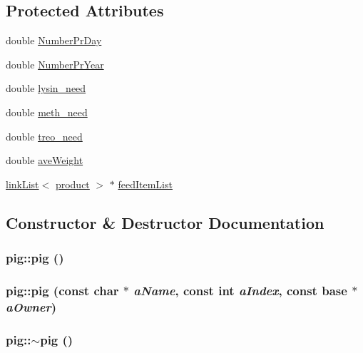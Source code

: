 \subsection*{Protected Attributes}
\begin{DoxyCompactItemize}
\item 
double \hyperlink{classpig_abcbba53abf12eb308dc0222c6d4ce98a}{NumberPrDay}
\item 
double \hyperlink{classpig_afb0194a6ded917d3d286165e25cec0cd}{NumberPrYear}
\item 
double \hyperlink{classpig_a63e7cb037c0c044934a7fbd10506fb4f}{lysin\_\-need}
\item 
double \hyperlink{classpig_aaf0ac7abae7bd899541a8d2bc678f663}{meth\_\-need}
\item 
double \hyperlink{classpig_a075e78b1499a2a990cfc8ca062e8654b}{treo\_\-need}
\item 
double \hyperlink{classpig_ad0d49e469ffa3c79f23862863ec04735}{aveWeight}
\item 
\hyperlink{classlink_list}{linkList}$<$ \hyperlink{classproduct}{product} $>$ $\ast$ \hyperlink{classpig_aed511510eabc8fc25f1048f0528b86cf}{feedItemList}
\end{DoxyCompactItemize}


\subsection{Constructor \& Destructor Documentation}
\hypertarget{classpig_af941f59904d0c80142ef3dd970c00e17}{
\subsubsection[{pig}]{\setlength{\rightskip}{0pt plus 5cm}pig::pig ()}}
\label{classpig_af941f59904d0c80142ef3dd970c00e17}
\hypertarget{classpig_a6da82d7be7f29bba53eb9cb1081091ca}{
\subsubsection[{pig}]{\setlength{\rightskip}{0pt plus 5cm}pig::pig (const char $\ast$ {\em aName}, \/  const int {\em aIndex}, \/  const {\bf base} $\ast$ {\em aOwner})}}
\label{classpig_a6da82d7be7f29bba53eb9cb1081091ca}
\hypertarget{classpig_a12bb73819ea97c7df4c7dba0cbcaa819}{
\subsubsection[{$\sim$pig}]{\setlength{\rightskip}{0pt plus 5cm}pig::$\sim$pig ()}}
\label{classpig_a12bb73819ea97c7df4c7dba0cbcaa819}



